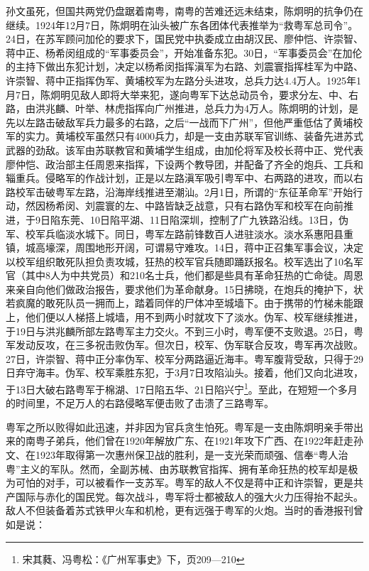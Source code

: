 孙文虽死，但国共两党仍盘踞着南粤，南粤的苦难还远未结束，陈炯明的抗争仍在继续。1924年12月7日，陈炯明在汕头被广东各团体代表推举为“救粤军总司令”。24日，在苏军顾问加伦的要求下，国民党中执委成立由胡汉民、廖仲恺、许崇智、蒋中正、杨希闵组成的“军事委员会”，开始准备东犯。30日，“军事委员会”在加伦的主持下做出东犯计划，决定以杨希闵指挥滇军为右路、刘震寰指挥桂军为中路、许崇智、蒋中正指挥伪军、黄埔校军为左路分头进攻，总兵力达4.4万人。1925年1月7日，陈炯明见敌人即将大举来犯，遂向粤军下达总动员令，要求分左、中、右路，由洪兆麟、叶举、林虎指挥向广州推进，总兵力为4万人。陈炯明的计划，是先以左路击破敌军兵力最多的右路，之后“一战而下广州”，但他严重低估了黄埔校军的实力。黄埔校军虽然只有4000兵力，却是一支由苏联军官训练、装备先进苏式武器的劲敌。该军由苏联教官和黄埔学生组成，由加伦将军及校长蒋中正、党代表廖仲恺、政治部主任周恩来指挥，下设两个教导团，并配备了齐全的炮兵、工兵和辎重兵。侵略军的作战计划，正是以左路滇军吸引粤军中、右两路的进攻，而以右路校军击破粤军左路，沿海岸线推进至潮汕。2月1日，所谓的“东征革命军”开始行动，然因杨希闵、刘震寰的左、中路皆缺乏战意，只有右路伪军和校军在向前推进，于9日陷东莞、10日陷平湖、11日陷深圳，控制了广九铁路沿线。13日，伪军、校军兵临淡水城下。同日，粤军左路前锋数百人进驻淡水。淡水系惠阳县重镇，城高壕深，周围地形开阔，可谓易守难攻。14日，蒋中正召集军事会议，决定以校军组织敢死队担负责攻城，狂热的校军官兵随即踊跃报名。校军选出了10名军官（其中8人为中共党员）和210名士兵，他们都是些具有革命狂热的亡命徒。周恩来亲自向他们做政治报告，要求他们为革命献身。15日拂晓，在炮兵的掩护下，状若疯魔的敢死队员一拥而上，踏着同伴的尸体冲至城墙下。由于携带的竹梯未能跟上，他们便以人梯搭上城墙，用不到两小时就攻下了淡水。伪军、校军继续推进，于19日与洪兆麟所部左路粤军主力交火。不到三小时，粤军便不支败退。25日，粤军发动反攻，在三多祝击败伪军。但次日，校军、伪军联合反攻，粤军再次战败。27日，许崇智、蒋中正分率伪军、校军分两路逼近海丰。粤军腹背受敌，只得于29日弃守海丰。伪军、校军乘胜东犯，于3月7日攻陷汕头。接着，他们又向北进攻，于13日大破右路粤军于棉湖、17日陷五华、21日陷兴宁\footnote{宋其蕤、冯粤松：《广州军事史》下，页209—210}。至此，在短短一个多月的时间里，不足万人的右路侵略军便击败了击溃了三路粤军。

粤军之所以败得如此迅速，并非因为官兵贪生怕死。粤军是一支由陈炯明亲手带出来的南粤子弟兵，他们曾在1920年解放广东、在1921年攻下广西、在1922年赶走孙文、在1923年取得第一次惠州保卫战的胜利，是一支光荣而顽强、信奉“粤人治粤”主义的军队。然而，全副苏械、由苏联教官指挥、拥有革命狂热的校军却是极为可怕的对手，可以被看作一支苏军。粤军的敌人不仅是蒋中正和许崇智，更是共产国际与赤化的国民党。每次战斗，粤军将士都被敌人的强大火力压得抬不起头。敌人不但装备着苏式铁甲火车和机枪，更有远强于粤军的火炮。当时的香港报刊曾如是说：

